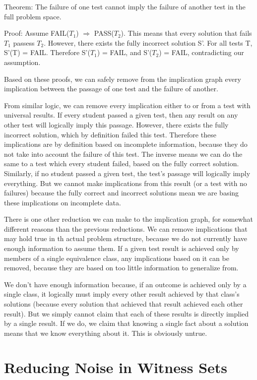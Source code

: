 \documentclass[11pt,twoside]{article}
\begin{document}
Theorem: The failure of one test cannot imply the failure of another test in the full problem space.

Proof: Assume FAIL($T_1$) $\Rightarrow$ PASS($T_2$). This means that every solution that fails $T_1$ passess $T_2$. However, there exists the fully incorrect solution S'. For all tests T, S'(T) = FAIL. Therefore S'($T_1$) = FAIL, and S'($T_2$) = FAIL, contradicting our assumption.


Based on these proofs, we can safely remove from the implication graph every implication between the passage of one test and the failure of another.

From similar logic, we can remove every implication either to or from a test with universal results. If every student passed a given test, then any result on any other test will logically imply this passage. However, there exists the fully incorrect solution, which by definition failed this test. Therefore these implications are by definition based on incomplete information, because they do not take into account the failure of this test. The inverse means we can do the same to a test which every student failed, based on the fully correct solution. Similarly, if no student passed a given test, the  test's passage will logically imply everything. But we cannot make implications  from this result (or a test with no failures) because the fully correct and incorrect solutions mean we are basing these implications on incomplete data.

There is one other reduction we can make to the implication graph, for somewhat different reasons than the previous reductions. We can remove implications that may hold true in th actual problem structure, because we do not currently have enough information to assume them. If a given test result is achieved only by members of a single equivalence class, any implications based on it can be removed, because they are based on too little information to generalize from.

We don't have enough information because, if an outcome is achieved only by a single class, it logically must imply every other result achieved by that class's solutions (because every solution that achieved that result achieved each other result). But we simply cannot claim that each of these results is directly implied by a single result. If we do, we claim that knowing a single fact about a solution means that we know everything about it. This is obviously untrue.


\section{Reducing Noise in Witness Sets}
\end{document}
